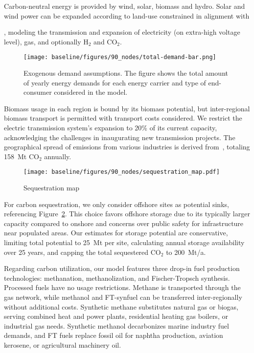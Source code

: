 \documentclass[twocolumn]{article}
\newcommand{\carbon}{CO$_2$}
\newcommand{\hydrogen}{H$_2$}
\begin{document}
Carbon-neutral energy is provided by wind, solar, biomass and hydro. Solar and wind power can be expanded according to land-use constrained in alignment with

, modeling the transmission and expansion of electricity (on extra-high voltage level), gas, and optionally \hydrogen{} and \carbon{}.



\begin{figure}
    \texttt{[image: baseline/figures/90\_nodes/total-demand-bar.png]}
    \caption{Exogenous demand assumptions. The figure shows the total amount of yearly energy demands for each energy carrier and type of end-consumer considered in the model.}
    \label{fig:total-demand-bar}
\end{figure}


Biomass usage in each region is bound by its biomass potential, but inter-regional biomass transport is permitted with transport costs considered. We restrict the electric transmission system's expansion to 20\% of its current capacity, acknowledging the challenges in inaugurating new transmission projects. The geographical spread of emissions from various industries is derived from~\cite{piamanzGeoreferencedIndustrialSites2018}, totaling 158~Mt \carbon{} annually.

\begin{figure}[h]
    \centering
    \texttt{[image: baseline/figures/90\_nodes/sequestration\_map.pdf]}
    \caption{Sequestration map}
    \label{fig:sequestration_map}
\end{figure}

For carbon sequestration, we only consider offshore sites as potential sinks, referencing Figure~\ref{fig:sequestration_map}. This choice favors offshore storage due to its typically larger capacity compared to onshore and concerns over public safety for infrastructure near populated areas. Our estimates for storage potential are conservative, limiting total potential to 25~Mt per site, calculating annual storage availability over 25 years, and capping the total sequestered \carbon{} to 200~Mt/a.



Regarding carbon utilization, our model features three drop-in fuel production technologies: methanation, methanolization, and Fischer-Tropsch synthesis. Processed fuels have no usage restrictions. Methane is transported through the gas network, while methanol and FT-synfuel can be transferred inter-regionally without additional costs. Synthetic methane substitutes natural gas or biogas, serving combined heat and power plants, residential heating gas boilers, or industrial gas needs. Synthetic methanol decarbonizes marine industry fuel demands, and FT fuels replace fossil oil for naphtha production, aviation kerosene, or agricultural machinery oil.
\end{document}
